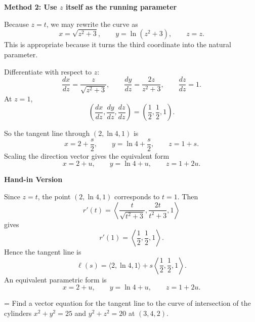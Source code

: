 \documentclass[a4paper,12pt,twocolumn]{article}
\newlength{\problemnumberwidth}
\newenvironment{solutionbox}{\begin{framed}}{\end{framed}}
\newcommand{\problem}[3]{%
  \Needspace{10\baselineskip}%
  \phantomsection\label{#1}%
  \par\vspace{0.8em}%
  \noindent
  \hangindent=\problemnumberwidth
  \hangafter=1
  \makebox[\problemnumberwidth][l]{\textbf{#2.}}#3\par
}
\begin{document}
\begin{solutionbox}
\textbf{Method 2: Use \(z\) itself as the running parameter}

\begin{steps}
\item Because \(z=t\), we may rewrite the curve as
\[
x=\sqrt{z^2+3},\qquad y=\ln(z^2+3),\qquad z=z.
\]
This is appropriate because it turns the third coordinate into the natural parameter.

\item Differentiate with respect to \(z\):
\[
\frac{dx}{dz}=\frac{z}{\sqrt{z^2+3}},\qquad
\frac{dy}{dz}=\frac{2z}{z^2+3},\qquad
\frac{dz}{dz}=1.
\]
At \(z=1\),
\[
\left(\frac{dx}{dz},\frac{dy}{dz},\frac{dz}{dz}\right)=\left(\frac12,\frac12,1\right).
\]

\item So the tangent line through \((2,\ln 4,1)\) is
\[
x=2+\frac{s}{2},\qquad y=\ln 4+\frac{s}{2},\qquad z=1+s.
\]
Scaling the direction vector gives the equivalent form
\[
\boxed{x=2+u,\qquad y=\ln 4+u,\qquad z=1+2u.}
\]
\end{steps}
\end{solutionbox}

\begin{solutionbox}
\textbf{Hand-in Version}

Since \(z=t\), the point \((2,\ln 4,1)\) corresponds to \(t=1\). Then
\[
r'(t)=\left\langle \frac{t}{\sqrt{t^2+3}},\frac{2t}{t^2+3},1\right\rangle
\]
gives
\[
r'(1)=\left\langle \frac12,\frac12,1\right\rangle.
\]
Hence the tangent line is
\[
\boxed{\ell(s)=\langle 2,\ln 4,1\rangle+s\left\langle \frac12,\frac12,1\right\rangle.}
\]
An equivalent parametric form is
\[
\boxed{x=2+u,\qquad y=\ln 4+u,\qquad z=1+2u.}
\]
\end{solutionbox}

\problem{prob:13-2-29}{29}{Find a vector equation for the tangent line to the curve of intersection of the cylinders \(x^2+y^2=25\) and \(y^2+z^2=20\) at \((3,4,2)\).}
\end{document}
